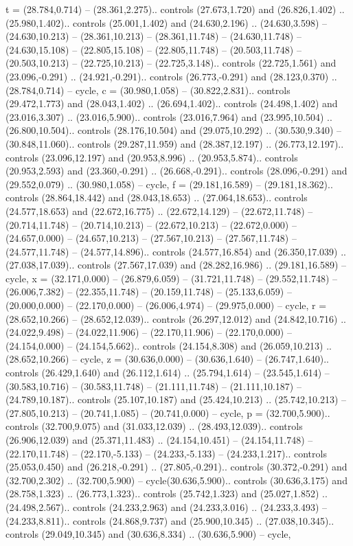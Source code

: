 {t} = {(28.784,0.714) -- (28.361,2.275).. controls (27.673,1.720) and (26.826,1.402) .. (25.980,1.402).. controls (25.001,1.402) and (24.630,2.196) .. (24.630,3.598) -- (24.630,10.213) -- (28.361,10.213) -- (28.361,11.748) -- (24.630,11.748) -- (24.630,15.108) -- (22.805,15.108) -- (22.805,11.748) -- (20.503,11.748) -- (20.503,10.213) -- (22.725,10.213) -- (22.725,3.148).. controls (22.725,1.561) and (23.096,-0.291) .. (24.921,-0.291).. controls (26.773,-0.291) and (28.123,0.370) .. (28.784,0.714) -- cycle},
{c} = {(30.980,1.058) -- (30.822,2.831).. controls (29.472,1.773) and (28.043,1.402) .. (26.694,1.402).. controls (24.498,1.402) and (23.016,3.307) .. (23.016,5.900).. controls (23.016,7.964) and (23.995,10.504) .. (26.800,10.504).. controls (28.176,10.504) and (29.075,10.292) .. (30.530,9.340) -- (30.848,11.060).. controls (29.287,11.959) and (28.387,12.197) .. (26.773,12.197).. controls (23.096,12.197) and (20.953,8.996) .. (20.953,5.874).. controls (20.953,2.593) and (23.360,-0.291) .. (26.668,-0.291).. controls (28.096,-0.291) and (29.552,0.079) .. (30.980,1.058) -- cycle},
{f} = {(29.181,16.589) -- (29.181,18.362).. controls (28.864,18.442) and (28.043,18.653) .. (27.064,18.653).. controls (24.577,18.653) and (22.672,16.775) .. (22.672,14.129) -- (22.672,11.748) -- (20.714,11.748) -- (20.714,10.213) -- (22.672,10.213) -- (22.672,0.000) -- (24.657,0.000) -- (24.657,10.213) -- (27.567,10.213) -- (27.567,11.748) -- (24.577,11.748) -- (24.577,14.896).. controls (24.577,16.854) and (26.350,17.039) .. (27.038,17.039).. controls (27.567,17.039) and (28.282,16.986) .. (29.181,16.589) -- cycle},
{x} = {(32.171,0.000) -- (26.879,6.059) -- (31.721,11.748) -- (29.552,11.748) -- (26.006,7.382) -- (22.355,11.748) -- (20.159,11.748) -- (25.133,6.059) -- (20.000,0.000) -- (22.170,0.000) -- (26.006,4.974) -- (29.975,0.000) -- cycle},
{r} = {(28.652,10.266) -- (28.652,12.039).. controls (26.297,12.012) and (24.842,10.716) .. (24.022,9.498) -- (24.022,11.906) -- (22.170,11.906) -- (22.170,0.000) -- (24.154,0.000) -- (24.154,5.662).. controls (24.154,8.308) and (26.059,10.213) .. (28.652,10.266) -- cycle},
{z} = {(30.636,0.000) -- (30.636,1.640) -- (26.747,1.640).. controls (26.429,1.640) and (26.112,1.614) .. (25.794,1.614) -- (23.545,1.614) -- (30.583,10.716) -- (30.583,11.748) -- (21.111,11.748) -- (21.111,10.187) -- (24.789,10.187).. controls (25.107,10.187) and (25.424,10.213) .. (25.742,10.213) -- (27.805,10.213) -- (20.741,1.085) -- (20.741,0.000) -- cycle},
{p} = {(32.700,5.900).. controls (32.700,9.075) and (31.033,12.039) .. (28.493,12.039).. controls (26.906,12.039) and (25.371,11.483) .. (24.154,10.451) -- (24.154,11.748) -- (22.170,11.748) -- (22.170,-5.133) -- (24.233,-5.133) -- (24.233,1.217).. controls (25.053,0.450) and (26.218,-0.291) .. (27.805,-0.291).. controls (30.372,-0.291) and (32.700,2.302) .. (32.700,5.900) -- cycle(30.636,5.900).. controls (30.636,3.175) and (28.758,1.323) .. (26.773,1.323).. controls (25.742,1.323) and (25.027,1.852) .. (24.498,2.567).. controls (24.233,2.963) and (24.233,3.016) .. (24.233,3.493) -- (24.233,8.811).. controls (24.868,9.737) and (25.900,10.345) .. (27.038,10.345).. controls (29.049,10.345) and (30.636,8.334) .. (30.636,5.900) -- cycle},
